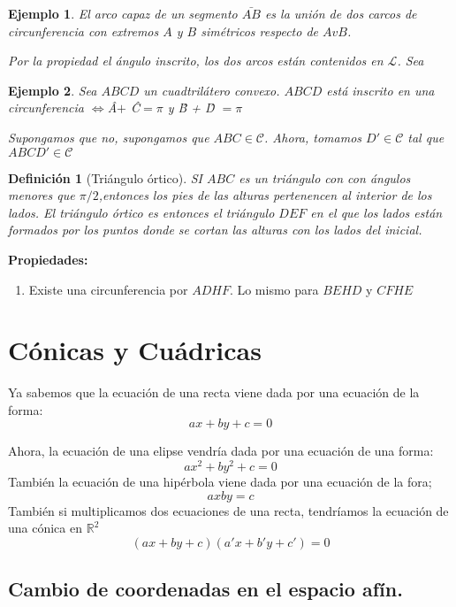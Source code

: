 \documentclass[11pt, a4paper, titlepage]{article}
\makeatletter
\renewenvironment{proof}[1][\proofname] {\vspace{-15pt}\par\pushQED{\qed}\normalfont\topsep6\p@\@plus6\p@\relax\trivlist\item[\hskip\labelsep\it#1\@addpunct{.}]\ignorespaces}{\popQED\endtrivlist\@endpefalse}
\newcommand{\R}{\mathbb{R}}
\renewenvironment{proof}[1][\proofname] {\par\pushQED{\qed}\normalfont\topsep6\p@\@plus6\p@\relax\trivlist\item[\hskip\labelsep\itshape\sffamily#1\@addpunct{.}]\ignorespaces}{\popQED\endtrivlist\@endpefalse}
\theoremstyle{theorem-style}
\theoremstyle{definition-style}
\newtheorem{ndef}{Definición}[section]
\theoremstyle{remark-style}
\theoremstyle{example-style}
\newtheorem{ejemplo}{Ejemplo}[section]
\newenvironment{nlist}
{\begin{enumerate}
    \renewcommand\labelenumi{(\emph{\roman{enumi})}}}
  {\end{enumerate}}
\makeatother
\begin{document}
\begin{ejemplo}
	El arco capaz de un segmento $\bar{AB}$ es la unión de dos carcos de circunferencia con extremos $A$ y $B$ simétricos respecto de $AvB$.
	
	\begin{proof}[Solución]
	Por la propiedad el ángulo inscrito, los dos arcos están contenidos en $\mathcal L$. Sea 
	
\end{proof}
\end{ejemplo}
\begin{ejemplo}
	Sea $ABCD$ un cuadtrilátero convexo. $ABCD$ está inscrito en una circunferencia $\iff $\^{A}$ +$ \^{C}$ = \pi$ y \^{B} + \^{D} $ = \pi$
	\begin{proof}
	Supongamos que no, supongamos que $ABC \in \mathcal C$. Ahora, tomamos $D' \in \mathcal C$ tal que $ABCD' \in \mathcal C $
\end{proof}
\end{ejemplo}

\begin{ndef}[Triángulo órtico]
	SI $ABC$ es un triángulo con con ángulos menores que $\pi/2$,entonces los pies de las alturas pertenencen al interior de los lados. El triángulo órtico es entonces el triángulo $DEF$ en el que los lados están formados por los puntos donde se cortan las alturas con los lados del inicial.
\end{ndef}

\textbf{Propiedades:}\\
\begin{nlist}
	\item Existe una circunferencia por $ADHF$. Lo mismo para $BEHD$ y $CFHE$
\end{nlist}

\section{Cónicas y Cuádricas}
Ya sabemos que la ecuación de una recta viene dada por una ecuación de la forma:
\[
ax + by +c = 0
\]

Ahora, la ecuación de una elipse vendría dada por una ecuación de una forma:
\[
ax^2 + by^2 + c = 0
\]
También la ecuación de una hipérbola viene dada por una ecuación de la fora;
\[
axby = c
\]
También si multiplicamos dos ecuaciones de una recta, tendríamos la ecuación de una cónica en $\R^2$
\[
(ax + by +c)(a'x+b'y+c') = 0
\]

\subsection{Cambio de coordenadas en el espacio afín.}
\end{document}
